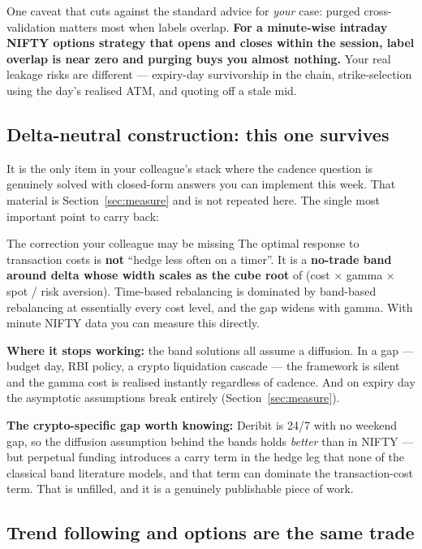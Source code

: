 \documentclass[11pt,a4paper]{article}
\newcommand{\srcnote}[1]{{\footnotesize\color{soft}#1\par}}
\begin{document}
\srcnote{One caveat that cuts against the standard advice for \emph{your} case:
purged cross-validation matters most when labels overlap. \textbf{For a
minute-wise intraday NIFTY options strategy that opens and closes within the
session, label overlap is near zero and purging buys you almost nothing.} Your real
leakage risks are different --- expiry-day survivorship in the chain,
strike-selection using the day's realised ATM, and quoting off a stale mid.}

\subsection{Delta-neutral construction: this one survives}

It is the only item in your colleague's stack where the cadence question is
genuinely solved with closed-form answers you can implement this week. That
material is Section~\ref{sec:measure} and is not repeated here. The single most
important point to carry back:

\begin{keyfact}{The correction your colleague may be missing}
The optimal response to transaction costs is \textbf{not} ``hedge less often on a
timer''. It is a \textbf{no-trade band around delta whose width scales as the cube
root} of (cost $\times$ gamma $\times$ spot / risk aversion). Time-based
rebalancing is dominated by band-based rebalancing at essentially every cost level,
and the gap widens with gamma. With minute NIFTY data you can measure this directly.
\end{keyfact}

\textbf{Where it stops working:} the band solutions all assume a diffusion. In a gap
--- budget day, RBI policy, a crypto liquidation cascade --- the framework is silent
and the gamma cost is realised instantly regardless of cadence. And on expiry day
the asymptotic assumptions break entirely (Section~\ref{sec:measure}).

\textbf{The crypto-specific gap worth knowing:} Deribit is 24/7 with no weekend gap,
so the diffusion assumption behind the bands holds \emph{better} than in NIFTY ---
but perpetual funding introduces a carry term in the hedge leg that none of the
classical band literature models, and that term can dominate the transaction-cost
term. That is unfilled, and it is a genuinely publishable piece of work.

\subsection{Trend following and options are the same trade}
\label{sec:trendopts}
\end{document}
